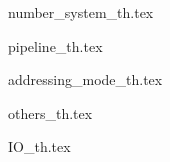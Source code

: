 
{number_system_th.tex}      \newpage

{pipeline_th.tex}            \newpage

{addressing_mode_th.tex}            \newpage

{others_th.tex}            \newpage

{IO_th.tex}            \newpage
